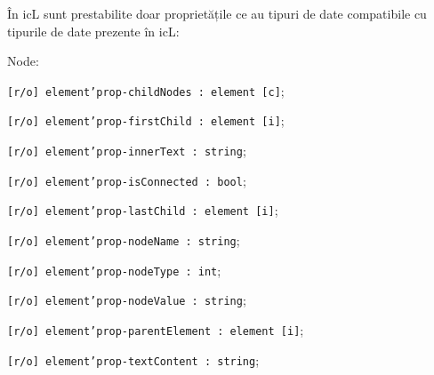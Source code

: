 În icL sunt prestabilite doar proprietățile ce au tipuri de date compatibile cu tipurile de date prezente în icL:
\begin{icItems}
	\item Node:	
	\begin{icItems}
		\item \texttt{[r/o] element'prop-childNodes : element [c]};
		\item \texttt{[r/o] element'prop-firstChild : element [i]};
		\item \texttt{[r/o] element'prop-innerText : string};
		\item \texttt{[r/o] element'prop-isConnected : bool};
		\item \texttt{[r/o] element'prop-lastChild : element [i]};
		\item \texttt{[r/o] element'prop-nodeName : string};
		\item \texttt{[r/o] element'prop-nodeType : int};
		\item \texttt{[r/o] element'prop-nodeValue : string};
		\item \texttt{[r/o] element'prop-parentElement : element [i]};
		\item \texttt{[r/o] element'prop-textContent : string};
	\end{icItems}
	

\end{icItems}
